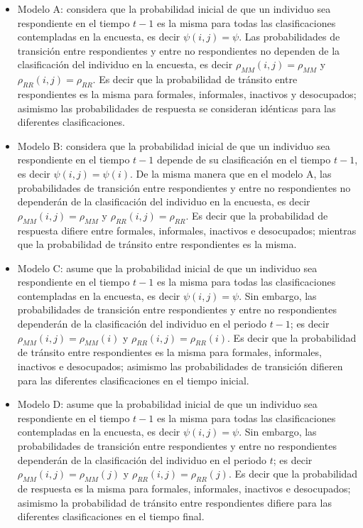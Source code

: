 \documentclass[
  12pt,
  spanish,
]{book}
\providecommand{\tightlist}{%
  \setlength{\itemsep}{0pt}\setlength{\parskip}{0pt}}
\begin{document}
\begin{itemize}
\tightlist
\item
  Modelo A: considera que la probabilidad inicial de que un individuo sea respondiente en el tiempo \(t-1\) es la misma para todas las clasificaciones contempladas en la encuesta, es decir \(\psi(i,j)=\psi\). Las probabilidades de transición entre respondientes y entre no respondientes no dependen de la clasificación del individuo en la encuesta, es decir \(\rho_{MM}(i,j)=\rho_{MM}\) y \(\rho_{RR}(i,j)=\rho_{RR}\). Es decir que la probabilidad de tránsito entre respondientes es la misma para formales, informales, inactivos y desocupados; asimismo las probabilidades de respuesta se consideran idénticas para las diferentes clasificaciones.
\item
  Modelo B: considera que la probabilidad inicial de que un individuo sea respondiente en el tiempo \(t-1\) depende de su clasificación en el tiempo \(t-1\), es decir \(\psi(i,j)=\psi(i)\). De la misma manera que en el modelo A, las probabilidades de transición entre respondientes y entre no respondientes no dependerán de la clasificación del individuo en la encuesta, es decir \(\rho_{MM}(i,j)=\rho_{MM}\) y \(\rho_{RR}(i,j)=\rho_{RR}\). Es decir que la probabilidad de respuesta difiere entre formales, informales, inactivos e desocupados; mientras que la probabilidad de tránsito entre respondientes es la misma.
\item
  Modelo C: asume que la probabilidad inicial de que un individuo sea respondiente en el tiempo \(t-1\) es la misma para todas las clasificaciones contempladas en la encuesta, es decir \(\psi(i,j)=\psi\). Sin embargo, las probabilidades de transición entre respondientes y entre no respondientes dependerán de la clasificación del individuo en el periodo \(t-1\); es decir \(\rho_{MM}(i,j)=\rho_{MM}(i)\) y \(\rho_{RR}(i,j)=\rho_{RR}(i)\). Es decir que la probabilidad de tránsito entre respondientes es la misma para formales, informales, inactivos e desocupados; asimismo las probabilidades de transición difieren para las diferentes clasificaciones en el tiempo inicial.
\item
  Modelo D: asume que la probabilidad inicial de que un individuo sea respondiente en el tiempo \(t-1\) es la misma para todas las clasificaciones contempladas en la encuesta, es decir \(\psi(i,j)=\psi\). Sin embargo, las probabilidades de transición entre respondientes y entre no respondientes dependerán de la clasificación del individuo en el periodo \(t\); es decir \(\rho_{MM}(i,j)=\rho_{MM}(j)\) y \(\rho_{RR}(i,j)=\rho_{RR}(j)\). Es decir que la probabilidad de respuesta es la misma para formales, informales, inactivos e desocupados; asimismo la probabilidad de tránsito entre respondientes difiere para las diferentes clasificaciones en el tiempo final.
\end{itemize}
\end{document}
